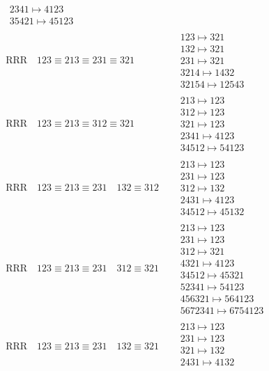 \documentclass{article}
\begin{document}
\begin{align}
\begin{matrix}
2341 \mapsto 4123
\\
35421 \mapsto 45123
\end{matrix}
\\
\text{RRR}
\quad
123\equiv213\equiv231\equiv321
\quad
&
\begin{matrix}
123 \mapsto 321
\\
132 \mapsto 321
\\
231 \mapsto 321
\\
3214 \mapsto 1432
\\
32154 \mapsto 12543
\end{matrix}
\\
\text{RRR}
\quad
123\equiv213\equiv312\equiv321
\quad
&
\begin{matrix}
213 \mapsto 123
\\
312 \mapsto 123
\\
321 \mapsto 123
\\
2341 \mapsto 4123
\\
34512 \mapsto 54123
\end{matrix}
\\
\text{RRR}
\quad
123\equiv213\equiv231
\quad
132\equiv312
\quad
&
\begin{matrix}
213 \mapsto 123
\\
231 \mapsto 123
\\
312 \mapsto 132
\\
2431 \mapsto 4123
\\
34512 \mapsto 45132
\end{matrix}
\\
\text{RRR}
\quad
123\equiv213\equiv231
\quad
312\equiv321
\quad
&
\begin{matrix}
213 \mapsto 123
\\
231 \mapsto 123
\\
312 \mapsto 321
\\
4321 \mapsto 4123
\\
34512 \mapsto 45321
\\
52341 \mapsto 54123
\\
456321 \mapsto 564123
\\
5672341 \mapsto 6754123
\end{matrix}
\\
\text{RRR}
\quad
123\equiv213\equiv231
\quad
132\equiv321
\quad
&
\begin{matrix}
213 \mapsto 123
\\
231 \mapsto 123
\\
321 \mapsto 132
\\
2431 \mapsto 4132
\\

\end{matrix}
\end{align}
\end{document}

